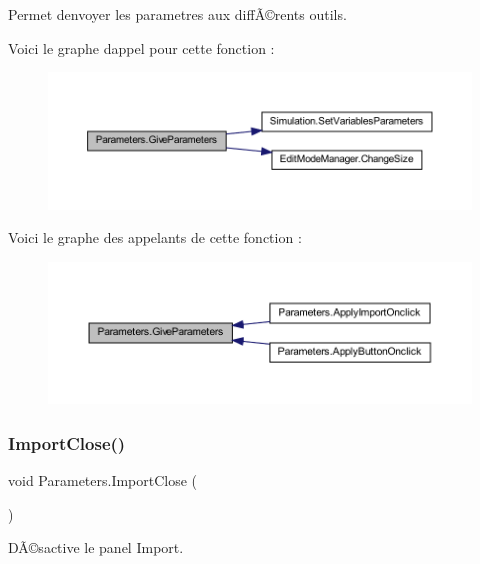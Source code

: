 Permet d\textquotesingle{}envoyer les parametres aux diffÃ©rents outils. 

Voici le graphe d\textquotesingle{}appel pour cette fonction \+:
\nopagebreak
\begin{figure}[H]
\begin{center}
\leavevmode
\includegraphics[width=350pt]{class_parameters_abc57bdbb6a4e2f78c7d71f1fa26b5fe8_cgraph}
\end{center}
\end{figure}
Voici le graphe des appelants de cette fonction \+:
\nopagebreak
\begin{figure}[H]
\begin{center}
\leavevmode
\includegraphics[width=350pt]{class_parameters_abc57bdbb6a4e2f78c7d71f1fa26b5fe8_icgraph}
\end{center}
\end{figure}
\mbox{\label{class_parameters_a95a34ed3f54953655b8caf704caff1f5}} 
\subsubsection{\texorpdfstring{Import\+Close()}{ImportClose()}}
{\footnotesize\ttfamily void Parameters.\+Import\+Close (\begin{DoxyParamCaption}{ }\end{DoxyParamCaption})\hspace{0.3cm}{\ttfamily [inline]}}



DÃ©sactive le panel Import. 

